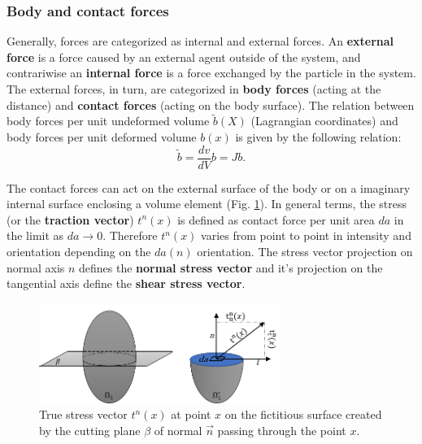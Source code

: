 \subsubsection*{Body and contact forces}\label{bodycontactforces}
Generally, forces are categorized as internal and external forces. An \textbf{external force } is a force caused by an external agent outside of the system, and contrariwise an \textbf{internal force} is a force exchanged by the particle in the system. The external forces, in turn, are categorized in \textbf{body forces} (acting at the distance) and \textbf{contact forces} (acting on the body surface). The relation between body forces per unit undeformed volume $\tilde{b}(X)$ (Lagrangian coordinates) and body forces per unit deformed volume $b(x)$ is given by the following relation:
\begin{equation}
\tilde{b} = \frac{dv}{dV} b = Jb.
\end{equation}

The contact forces can act on the external surface of the body or on a imaginary internal surface enclosing a volume element (Fig. \ref{internalcontactForceDefinition}). 
In general terms, the stress (or the \textbf{traction vector}) $t^n(x)$ is defined as contact force per unit area $da$ in the limit as $da \rightarrow 0$. Therefore $t^n(x)$ varies from point to point in intensity and orientation depending on the $da(n)$ orientation.  The stress vector projection on normal axis $n$ defines the \textbf{normal stress vector} and it's projection on the tangential axis define the \textbf{shear stress vector}.


\begin{figure}
\begin{center}
\includegraphics[width=0.7\textwidth,keepaspectratio]{figures/internalcontactForceDefinition.png} 
\caption[]{True stress vector $t^n(x)$ at point $x$ on the fictitious surface created  by the cutting plane $\beta$ of normal  $\overrightarrow n$ passing through the point $x$. }
\label{internalcontactForceDefinition}
\end{center}
\end{figure}

